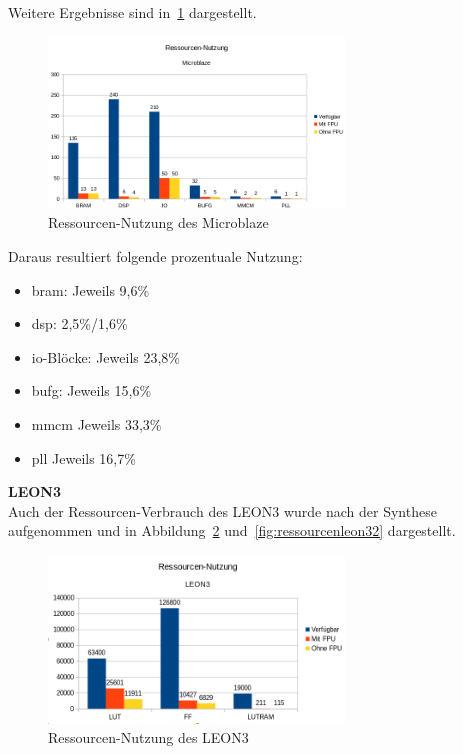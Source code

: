 Weitere Ergebnisse sind in~\ref{fig:ressourcenmb2} dargestellt.\\

\begin{figure}[H]
\centering
\includegraphics[width=0.7\textwidth]{Hauptteil/ressourcenmb2.png}
\caption{Ressourcen-Nutzung des Microblaze}
\label{fig:ressourcenmb2}
\end{figure}

Daraus resultiert folgende prozentuale Nutzung:\\
\begin{itemize}
  \item \ac{bram}: Jeweils 9,6\%
  \item \ac{dsp}: 2,5\%/1,6\%
  \item \ac{io}-Blöcke: Jeweils 23,8\%
  \item \ac{bufg}: Jeweils 15,6\%
  \item \ac{mmcm} Jeweils 33,3\%
  \item \ac{pll} Jeweils 16,7\%
\end{itemize}

\textbf{LEON3}\\

Auch der Ressourcen-Verbrauch des LEON3 wurde nach der Synthese aufgenommen und in Abbildung~\ref{fig:ressourcenleon31} und~\ref{fig:ressourcenleon32} dargestellt.\\

\begin{figure}[H]
\centering
\includegraphics[width=0.7\textwidth]{Hauptteil/ressourcennutzungleon31.png}
\caption{Ressourcen-Nutzung des LEON3}
\label{fig:ressourcenleon31}
\end{figure}

